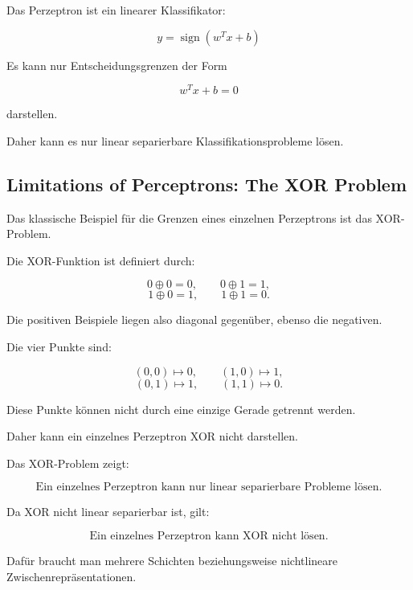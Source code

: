 \documentclass[11pt,a4paper]{scrartcl}
\begin{document}
\begin{answerbox}
    Das Perzeptron ist ein linearer Klassifikator:

    \[
        \boxed{
            y = \operatorname{sign}(w^Tx+b)
        }
    \]

    Es kann nur Entscheidungsgrenzen der Form

    \[
        \boxed{
            w^Tx+b=0
        }
    \]

    darstellen.

    Daher kann es nur linear separierbare Klassifikationsprobleme lösen.
\end{answerbox}

\subsection{Limitations of Perceptrons: The XOR Problem}

\begin{notebox}
    Das klassische Beispiel für die Grenzen eines einzelnen Perzeptrons ist das
    XOR-Problem.

    Die XOR-Funktion ist definiert durch:

    \[
        0 \oplus 0 = 0,
        \qquad
        0 \oplus 1 = 1,
    \]
    \[
        1 \oplus 0 = 1,
        \qquad
        1 \oplus 1 = 0.
    \]

    Die positiven Beispiele liegen also diagonal gegenüber, ebenso die negativen.
\end{notebox}

\begin{solutionbox}
    Die vier Punkte sind:

    \[
        (0,0) \mapsto 0,
        \qquad
        (1,0) \mapsto 1,
    \]
    \[
        (0,1) \mapsto 1,
        \qquad
        (1,1) \mapsto 0.
    \]

    Diese Punkte können nicht durch eine einzige Gerade getrennt werden.

    Daher kann ein einzelnes Perzeptron XOR nicht darstellen.
\end{solutionbox}

\begin{answerbox}
    Das XOR-Problem zeigt:

    \[
        \boxed{
            \text{Ein einzelnes Perzeptron kann nur linear separierbare Probleme lösen.}
        }
    \]

    Da XOR nicht linear separierbar ist, gilt:

    \[
        \boxed{
            \text{Ein einzelnes Perzeptron kann XOR nicht lösen.}
        }
    \]

    Dafür braucht man mehrere Schichten beziehungsweise nichtlineare
    Zwischenrepräsentationen.
\end{answerbox}
\end{document}
